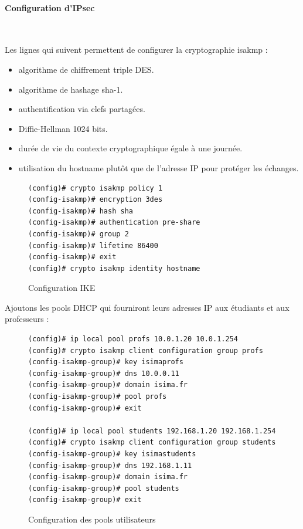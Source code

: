 \paragraph{Configuration d'IPsec}
~

Les lignes qui suivent permettent de configurer la cryptographie isakmp :
\begin{itemize}
	\item algorithme de chiffrement triple DES.
	\item algorithme de hashage sha-1.
	\item authentification via clefs partagées.
	\item Diffie-Hellman 1024 bits.
	\item durée de vie du contexte cryptographique égale à une journée.
	\item utilisation du hostname plutôt que de l'adresse IP pour protéger les échanges.
\end{itemize}


\begin{figure}[H]
	\begin{center}
		\begin{minipage}{0.90\textwidth}
			\begin{lstlisting}[frame=trBL]
(config)# crypto isakmp policy 1
(config-isakmp)# encryption 3des
(config-isakmp)# hash sha
(config-isakmp)# authentication pre-share
(config-isakmp)# group 2
(config-isakmp)# lifetime 86400
(config-isakmp)# exit
(config)# crypto isakmp identity hostname
			\end{lstlisting}
		\end{minipage}
	\end{center}
	\caption{Configuration IKE}
	\label{configuration_ike}
\end{figure}

Ajoutons les pools DHCP qui fourniront leurs adresses IP aux étudiants et aux professeurs :
\begin{figure}[H]
	\begin{center}
		\begin{minipage}{0.90\textwidth}
			\begin{lstlisting}[frame=trBL]
(config)# ip local pool profs 10.0.1.20 10.0.1.254
(config)# crypto isakmp client configuration group profs
(config-isakmp-group)# key isimaprofs
(config-isakmp-group)# dns 10.0.0.11
(config-isakmp-group)# domain isima.fr
(config-isakmp-group)# pool profs
(config-isakmp-group)# exit

(config)# ip local pool students 192.168.1.20 192.168.1.254
(config)# crypto isakmp client configuration group students
(config-isakmp-group)# key isimastudents
(config-isakmp-group)# dns 192.168.1.11
(config-isakmp-group)# domain isima.fr
(config-isakmp-group)# pool students
(config-isakmp-group)# exit
			\end{lstlisting}
		\end{minipage}
	\end{center}
	\caption{Configuration des pools utilisateurs}
	\label{configuration_pools_utilisateurs}
\end{figure}


